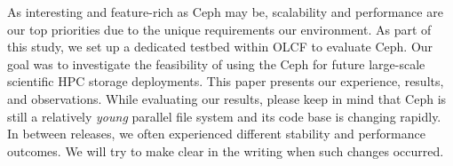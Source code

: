 \begin{comment}
In comparison to other parallel file
systems, Ceph has a number of distinctive features:

\begin{itemize}
 
\item Ceph has an intelligent and powerful data placement mechanism, known as
  CRUSH. The CRUSH algorithm allows a client to pre-calculate object
  placement and layout while taking into consideration of failure domains and
  hierarchical storage tiers.
  
  \item From the start, Ceph's design anticipated managing meta data and the
  name space with a cluster of meta data servers. It utilized a dynamic subtree
  partitioning strategy to continuously adapt meta data distribution to current
  demands.

  \item Ceph's design assumes that the system is composed of unreliable
  components; fault-detection and fault-tolerance (e.g., replication) are the
  norm rather than the exception. This is in line with the expectations and
  future directions of Exascale computing.

  \item Ceph is built on top of a unified object management layer, RADOS. Both
  meta data and the file data can take advantage of this uniformity. On top of
  RADOS, Ceph build and project a host of other features such as RESTful
  interface, S3 and Swift-compliant API, cloud integration.

  \item Most of the Ceph processes reside in user-space. Generally speaking,
this makes the system easier to debug and maintain. The client-side support has
long been integrated into Linux mainline kernel, which eases the deployment and
out-of-box experience.

\end{itemize}
\end{comment}

As interesting and feature-rich as Ceph may be,  scalability and performance
are our top priorities due to the unique requirements our environment.  As part
of this study, we set up a dedicated testbed within OLCF to  evaluate Ceph.
Our goal was to investigate the feasibility of using the Ceph for future
large-scale scientific HPC storage deployments. This paper presents our
experience, results, and observations.  While evaluating our results, please
keep in mind that Ceph is still a relatively \textit{young} parallel file
system and its code base is changing rapidly. In between releases, we often
experienced different stability and performance outcomes.  We will try to make
clear in the writing when such changes occurred.

